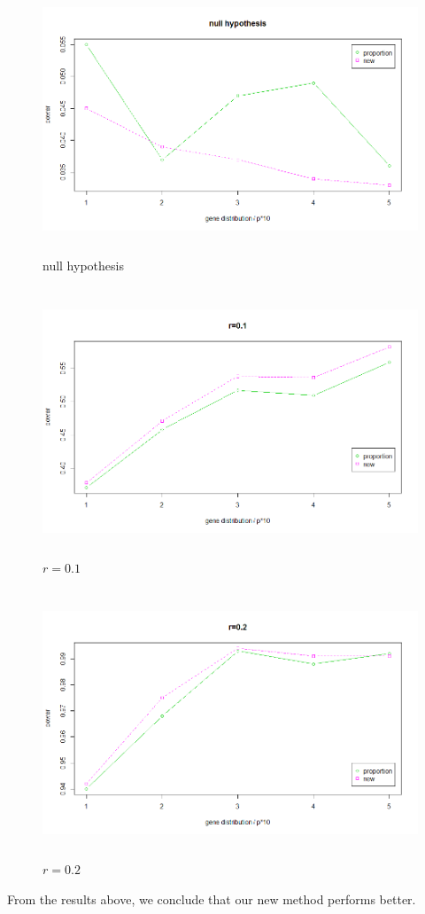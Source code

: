 \documentclass[a4,11pt,epsf, amssymb]{article}
\begin{document}
\begin{CJK}{GBK}{song}
\begin{figure}
\centering
\includegraphics[height = 8cm]{r0.png}
\caption{null hypothesis}
\end{figure}

\begin{figure}
\centering
\includegraphics[height = 8cm]{r1.png}
\caption{$r = 0.1$}
\end{figure}

\begin{figure}
\centering
\includegraphics[height = 8cm]{r2.png}
\caption{$r = 0.2$}
\end{figure}

From the results above, we conclude that our new method performs better.

\end{CJK}
\end{document}
